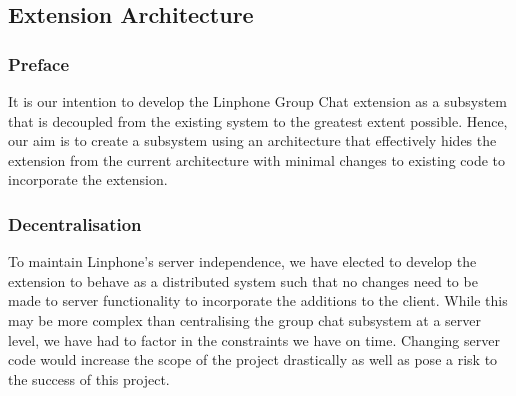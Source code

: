 \documentclass[11pt]{article}
\begin{document}
\subsection{Extension Architecture}
\subsubsection{Preface}
It is our intention to develop the Linphone Group Chat extension as a subsystem that is decoupled from the existing system to the greatest extent possible. Hence, our aim is to create a subsystem using an architecture that effectively hides the extension from the current architecture with minimal changes to existing code to incorporate the extension.

\subsubsection{Decentralisation}
To maintain Linphone's server independence, we have elected to develop the extension to behave as a distributed system such that no changes need to be made to server functionality to incorporate the additions to the client. While this may be more complex than centralising the group chat subsystem at a server level, we have had to factor in the constraints we have on time. Changing server code would increase the scope of the project drastically as well as pose a risk to the success of this project.
\end{document}
